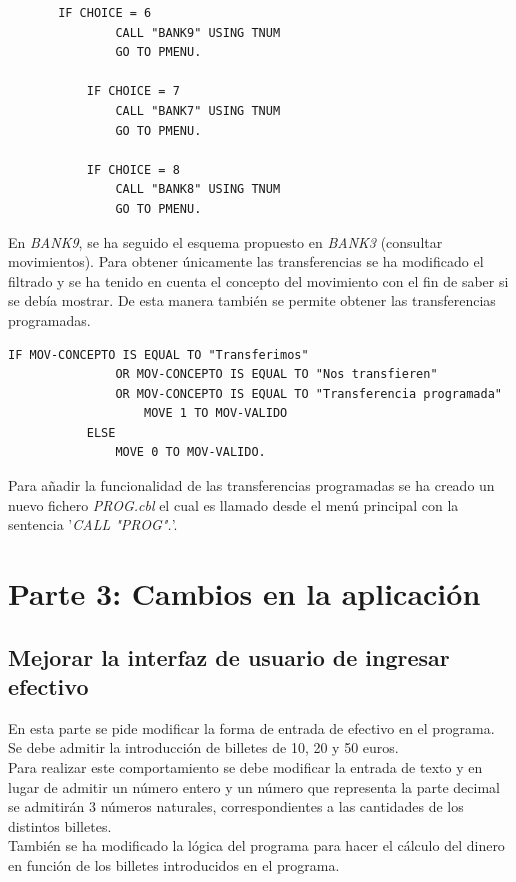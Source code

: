 \documentclass[10pt,a4paper]{article}
\begin{document}
\begin{lstlisting}
	   IF CHOICE = 6 
               CALL "BANK9" USING TNUM
               GO TO PMENU.

           IF CHOICE = 7
               CALL "BANK7" USING TNUM
               GO TO PMENU.

           IF CHOICE = 8
               CALL "BANK8" USING TNUM
               GO TO PMENU.
\end{lstlisting}

En \emph{BANK9}, se ha seguido el esquema propuesto en \emph{BANK3} (consultar movimientos).
Para obtener únicamente las transferencias se ha modificado el filtrado y se ha tenido en cuenta el concepto del movimiento con el fin de saber si se debía mostrar. De esta manera también se permite obtener las transferencias programadas.
\begin{lstlisting}
IF MOV-CONCEPTO IS EQUAL TO "Transferimos" 
               OR MOV-CONCEPTO IS EQUAL TO "Nos transfieren"
               OR MOV-CONCEPTO IS EQUAL TO "Transferencia programada"
                   MOVE 1 TO MOV-VALIDO
           ELSE 
               MOVE 0 TO MOV-VALIDO. 
\end{lstlisting}

Para añadir la funcionalidad de las transferencias programadas se ha creado un nuevo fichero \emph{PROG.cbl} el cual es llamado desde el menú principal con la sentencia '\emph{CALL "PROG".}'.
\section{Parte 3: Cambios en la aplicación}

\subsection{Mejorar la interfaz de usuario de ingresar efectivo}

En esta parte se pide modificar la forma de entrada de efectivo en el programa. Se debe admitir la introducción de billetes de 10, 20 y 50 euros.\\
Para realizar este comportamiento se debe modificar la entrada de texto y en lugar de admitir un número entero y un número que representa la parte decimal se admitirán 3 números naturales, correspondientes a las cantidades de los distintos billetes.\\

También se ha modificado la lógica del programa para hacer el cálculo del dinero en función de los billetes introducidos en el programa.\\
\end{document}
